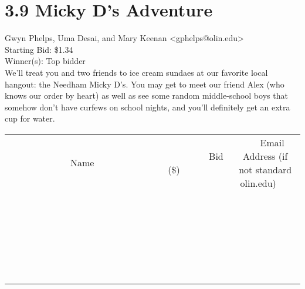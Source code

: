 \documentclass[11pt]{article}
\begin{document}
					\section*{3.9 Micky D's Adventure}
					Gwyn Phelps, Uma Desai, and Mary Keenan <gphelps@olin.edu> \\
					Starting Bid: \$1.34 \\
					Winner(s): Top bidder \\
					We'll treat you and two friends to ice cream sundaes at our favorite local hangout: the Needham Micky D's. You may get to meet our friend Alex (who knows our order by heart) as well as see some random middle-school boys that somehow don't have curfews on school nights, and you'll definitely get an extra cup for water. \\
					[6ex]
					\begin{tabular}{c c c}
						~~~~~~~~~~~~~Name~~~~~~~~~~~~~ & ~~~~~~~~~Bid (\$)~~~~~~~~~ & ~~~Email Address (if not standard olin.edu)~~~ \\
				
 & & \\
\hline
 & & \\
\hline
 & & \\
\hline
 & & \\
\hline
 & & \\
\hline
 & & \\
\hline
 & & \\
\hline
 & & \\
\hline
 & & \\
\hline
 & & \\
\hline
 & & \\
\hline
 & & \\
\hline
 & & \\
\hline
 & & \\
\hline
 & & \\
\hline
 & & \\
\hline
 & & \\
\hline
 & & \\
\hline
 & & \\
\hline
 & & \\
\hline
 & & \\
\hline
 & & \\
\hline
 & & \\
\hline
 & & \\
\hline
 & & \\
\hline
 & & \\
\hline
					\end{tabular}
					\clearpage
				
\end{document}
